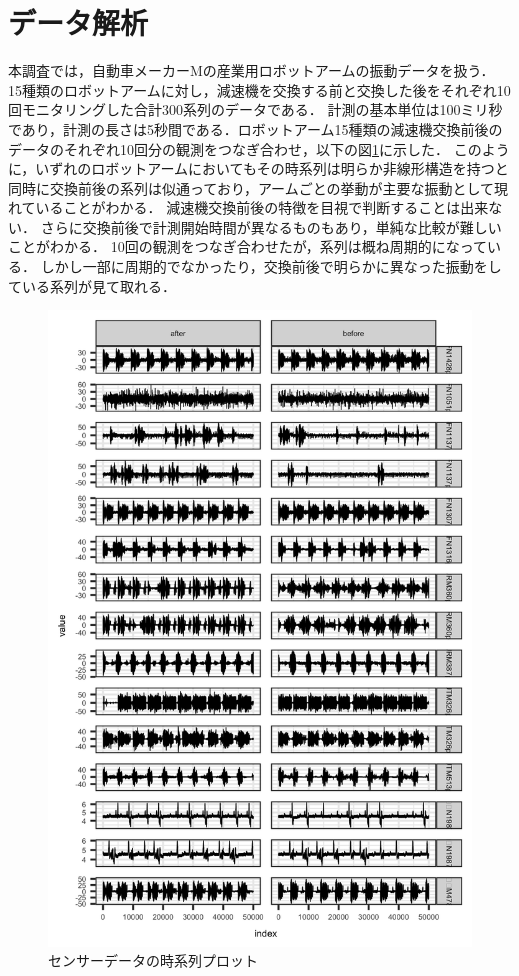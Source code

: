 \documentclass{jarticle}
\begin{document}
\section{データ解析}

本調査では，自動車メーカーMの産業用ロボットアームの振動データを扱う．
15種類のロボットアームに対し，減速機を交換する前と交換した後をそれぞれ10回モニタリングした合計300系列のデータである．
計測の基本単位は100ミリ秒であり，計測の長さは5秒間である．ロボットアーム15種類の減速機交換前後のデータのそれぞれ10回分の観測をつなぎ合わせ，以下の図\ref{fig:ts}に示した．
このように，いずれのロボットアームにおいてもその時系列は明らか非線形構造を持つと同時に交換前後の系列は似通っており，アームごとの挙動が主要な振動として現れていることがわかる．
減速機交換前後の特徴を目視で判断することは出来ない．
さらに交換前後で計測開始時間が異なるものもあり，単純な比較が難しいことがわかる．
10回の観測をつなぎ合わせたが，系列は概ね周期的になっている．
しかし一部に周期的でなかったり，交換前後で明らかに異なった振動をしている系列が見て取れる．
\begin{figure}[H]
\begin{center}
	\includegraphics[width=12cm]{fig/ts.png}	
	\caption{センサーデータの時系列プロット}\label{fig:ts}
\end{center}
\end{figure}
\end{document}

